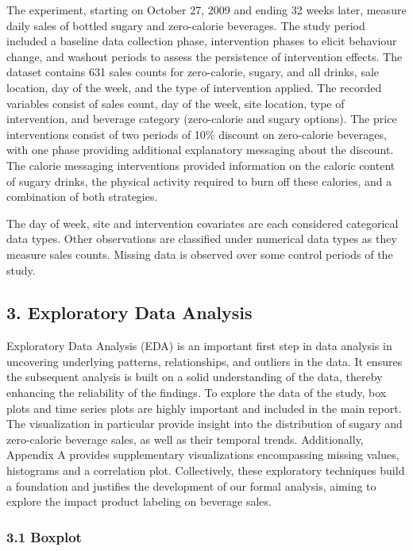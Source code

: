 \documentclass[
]{article}
\begin{document}
The experiment, starting on October 27, 2009 and ending 32 weeks later,
measure daily sales of bottled sugary and zero-calorie beverages. The
study period included a baseline data collection phase, intervention
phases to elicit behaviour change, and washout periods to assess the
persistence of intervention effects. The dataset contains 631 sales
counts for zero-calorie, sugary, and all drinks, sale location, day of
the week, and the type of intervention applied. The recorded variables
consist of sales count, day of the week, site location, type of
intervention, and beverage category (zero-calorie and sugary options).
The price interventions consist of two periods of 10\% discount on
zero-calorie beverages, with one phase providing additional explanatory
messaging about the discount. The calorie messaging interventions
provided information on the caloric content of sugary drinks, the
physical activity required to burn off these calories, and a combination
of both strategies.

The day of week, site and intervention covariates are each considered
categorical data types. Other observations are classified under
numerical data types as they measure sales counts. Missing data is
observed over some control periods of the study.

\hypertarget{exploratory-data-analysis}{%
\subsection{3. Exploratory Data
Analysis}\label{exploratory-data-analysis}}

Exploratory Data Analysis (EDA) is an important first step in data
analysis in uncovering underlying patterns, relationships, and outliers
in the data. It ensures the subsequent analysis is built on a solid
understanding of the data, thereby enhancing the reliability of the
findings. To explore the data of the study, box plots and time series
plots are highly important and included in the main report. The
visualization in particular provide insight into the distribution of
sugary and zero-calorie beverage sales, as well as their temporal
trends. Additionally, Appendix A provides supplementary visualizations
encompassing missing values, histograms and a correlation plot.
Collectively, these exploratory techniques build a foundation and
justifies the development of our formal analysis, aiming to explore the
impact product labeling on beverage sales.

\hypertarget{boxplot}{%
\subsubsection{3.1 Boxplot}\label{boxplot}}
\end{document}
